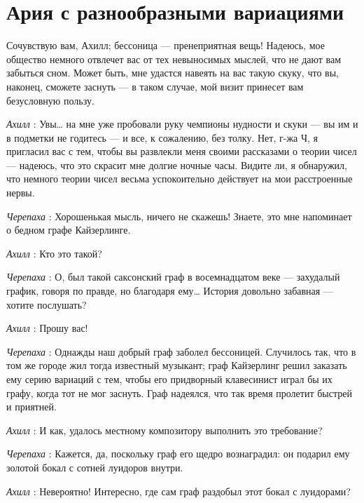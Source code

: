 \documentclass[../main.tex]{subfiles}
\begin{document}
\section{Ария с разнообразными вариациями}


\begin{dialogue}

 Сочувствую вам, Ахилл; бессоница --- пренеприятная вещь! Надеюсь, мое общество немного отвлечет вас от тех невыносимых мыслей, что не дают вам забыться сном. Может быть, мне удастся навеять на вас такую скуку, что вы, наконец, сможете заснуть --- в таком случае, мой визит принесет вам безусловную пользу.

\emph{Ахилл} : Увы\ldots{} на мне уже пробовали руку чемпионы нудности и скуки --- вы им и в подметки не годитесь --- и все, к сожалению, без толку. Нет, г-жа Ч, я пригласил вас с тем, чтобы вы развлекли меня своими рассказами о теории чисел --- надеюсь, что это скрасит мне долгие ночные часы. Видите ли, я обнаружил, что немного теории чисел весьма успокоительно действует на мои расстроенные нервы.

\emph{Черепаха} : Хорошенькая мысль, ничего не скажешь! Знаете, это мне напоминает о бедном графе Кайзерлинге.

\emph{Ахилл} : Кто это такой?

\emph{Черепаха} : О, был такой саксонский граф в восемнадцатом веке --- захудалый график, говоря по правде, но благодаря ему\ldots{} История довольно забавная --- хотите послушать?

\emph{Ахилл} : Прошу вас!

\emph{Черепаха} : Однажды наш добрый граф заболел бессоницей. Случилось так, что в том же городе жил тогда известный музыкант; граф Кайзерлинг решил заказать ему серию вариаций с тем, чтобы его придворный клавесинист играл бы их графу, когда тот не мог заснуть. Граф надеялся, что так время пролетит быстрей и приятней.

\emph{Ахилл} : И как, удалось местному композитору выполнить это требование?

\emph{Черепаха} : Кажется, да, поскольку граф его щедро вознаградил: он подарил ему золотой бокал с сотней луидоров внутри.

\emph{Ахилл} : Невероятно! Интересно, где сам граф раздобыл этот бокал с луидорами?


\end{dialogue}
\end{document}
